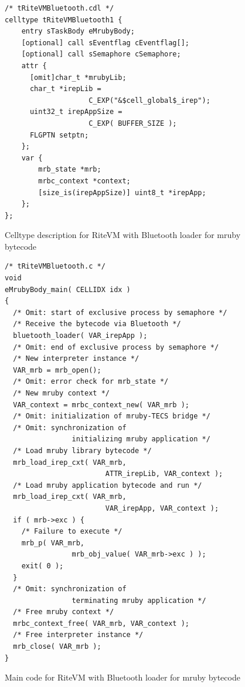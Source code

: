 \documentclass{sig-alternate-05-2015}
\begin{document}
\begin{figure}[t]
\centering
\begin{lstlisting}
/* tRiteVMBluetooth.cdl */
celltype tRiteVMBluetooth1 {
    entry sTaskBody eMrubyBody;
    [optional] call sEventflag cEventflag[];
    [optional] call sSemaphore cSemaphore;
    attr {
      [omit]char_t *mrubyLib;
      char_t *irepLib = 
                    C_EXP("&$cell_global$_irep");
      uint32_t irepAppSize = 
                    C_EXP( BUFFER_SIZE );
      FLGPTN setptn;
    };
    var {
        mrb_state *mrb;
        mrbc_context *context;
        [size_is(irepAppSize)] uint8_t *irepApp;
    };
};
\end{lstlisting}
\vspace{1mm}
\caption{Celltype description for RiteVM with Bluetooth loader for mruby bytecode}
\vspace{1mm}
\label{celltype_mrubybluetooth}
\end{figure}

\begin{figure}[t]
\centering
\begin{lstlisting}
/* tRiteVMBluetooth.c */
void
eMrubyBody_main( CELLIDX idx )
{
  /* Omit: start of exclusive process by semaphore */
  /* Receive the bytecode via Bluetooth */
  bluetooth_loader( VAR_irepApp );
  /* Omit: end of exclusive process by semaphore */
  /* New interpreter instance */
  VAR_mrb = mrb_open();
  /* Omit: error check for mrb_state */
  /* New mruby context */
  VAR_context = mrbc_context_new( VAR_mrb );
  /* Omit: initialization of mruby-TECS bridge */
  /* Omit: synchronization of
                initializing mruby application */
  /* Load mruby library bytecode */
  mrb_load_irep_cxt( VAR_mrb,
                        ATTR_irepLib, VAR_context );
  /* Load mruby application bytecode and run */
  mrb_load_irep_cxt( VAR_mrb,
                        VAR_irepApp, VAR_context );
  if ( mrb->exc ) {
    /* Failure to execute */
    mrb_p( VAR_mrb, 
                mrb_obj_value( VAR_mrb->exc ) );
    exit( 0 );
  }
  /* Omit: synchronization of
                terminating mruby application */
  /* Free mruby context */
  mrbc_context_free( VAR_mrb, VAR_context );
  /* Free interpreter instance */
  mrb_close( VAR_mrb );
}

\end{lstlisting}
\vspace{1mm}
\caption{Main code for RiteVM with Bluetooth loader for mruby bytecode}
\vspace{1mm}
\label{maincode_mrubybluetooth}
\end{figure}
\end{document}

